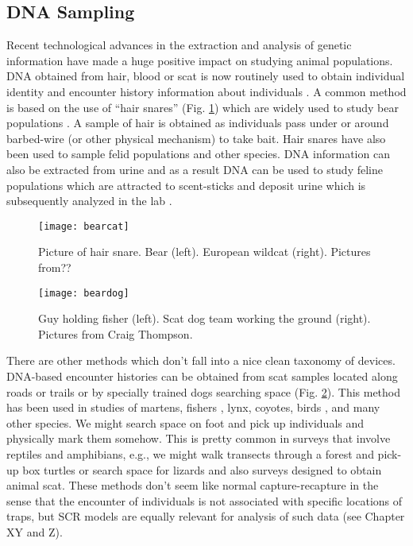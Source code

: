 \subsection{DNA Sampling}

Recent technological advances in the extraction and analysis of
genetic information have made a huge positive impact on studying
animal populations. DNA obtained from hair, blood or scat is now
routinely used to obtain individual identity and encounter history
information about individuals \citep{taberlet_bouvent:1992,
  woods_etal:1999, mills_etal:2000, schwartz_monfort:2008}.  A common
method is based on the use of ``hair snares'' (Fig. \ref{fig.bearcat})
which are widely used to study bear populations
\citep{woods_etal:1999, gardner_etal:2010, garshelis_etal:2006,
  kendall_etal:2009}.  A sample of hair is obtained as individuals
pass under or around barbed-wire (or other physical mechanism) to take
bait. Hair snares have also been used to sample felid populations
\citep{garciaalaniz_etal:2010} and other species. DNA information can
also be extracted from urine and as a result DNA can be used to study
feline populations which are attracted to scent-sticks and deposit
urine which is subsequently analyzed in the lab
\citep{valiere_taberlet:2000, kery_etal:2010}.


\begin{figure}
\begin{center}
\texttt{[image: bearcat]}
\end{center}
\caption{Picture of hair snare. Bear (left). European wildcat
  (right). Pictures from??}
\label{fig.bearcat}
\end{figure}

\begin{figure}
\begin{center}
\texttt{[image: beardog]}
\end{center}
\caption{Guy holding fisher (left). Scat dog team working the ground
  (right). Pictures from Craig Thompson.}
\label{fig.fisherscatdog}
\end{figure}


There are other methods which don't fall into a nice clean taxonomy of
devices. DNA-based encounter histories can be obtained from scat
samples located along roads or trails or by specially trained dogs
\citep{mackay_etal:2008} searching space
(Fig. \ref{fig.fisherscatdog}). This method has been used in studies
of martens, fishers \citep{thompson_etal:inpress}, lynx, coyotes,
birds \citet{kery_etal:2010}, and many other species. We might search
space on foot and pick up individuals and physically mark them
somehow. This is pretty common in surveys that involve reptiles and
amphibians, e.g., we might walk transects through a forest and pick-up
box turtles \citep{hall_etal:1999} or search space for lizards
\citep{royle_young:2008} and also surveys designed to obtain animal
scat. These methods don't seem like normal capture-recapture in the
sense that the encounter of individuals is not associated with
specific locations of traps, but SCR models are equally relevant for
analysis of such data (see Chapter XY and Z).



